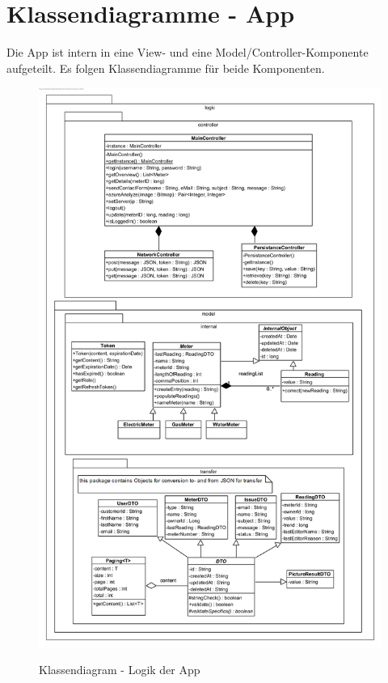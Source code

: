 \section{Klassendiagramme - App}
Die App ist intern in eine View- und eine Model/Controller-Komponente aufgeteilt. Es folgen Klassendiagramme für beide Komponenten.
\begin{figure}[H]
\centering
\includegraphics[scale=0.97]{img/diagrams/Android-Class-Diagram-Logic}\\
\caption{Klassendiagram - Logik der App}
\end{figure}


